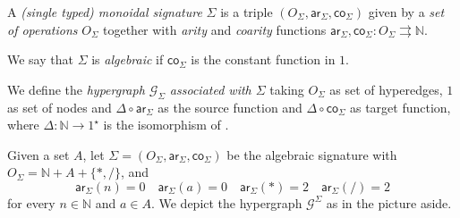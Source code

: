 \documentclass[3p]{elsarticle}
\newcommand{\ari}{\mathsf{ar}}
\newcommand{\coar}{\mathsf{co}}
\theoremstyle{remark}
\theoremstyle{definition}
\begin{document}
\smallskip 
\noindent
\begin{minipage}[l]{.75\linewidth}
	\begin{defi}\label{def:alg}
		A \emph{(single typed) monoidal signature} $\Sigma$ is a triple $(O_\Sigma, \ari_\Sigma, \coar_\Sigma)$ given by a \emph{set of operations} $O_\Sigma$ together with \emph{arity} and \emph{coarity} functions $\ari_\Sigma, \coar_\Sigma\colon O_\Sigma \rightrightarrows \mathbb{N}$.  
		
		We say that $\Sigma$ is \emph{algebraic} if $\coar_{\Sigma}$ is the constant function in $1$.
		
		We define the \emph{hypergraph $\mathcal{G}_\Sigma$ associated with $\Sigma$} taking $O_\Sigma$ as set of hyperedges, $1$ as set of nodes and $\Delta \circ \ari_\Sigma$ as the source function and $ \Delta \circ  \coar_{\Sigma}$ as target function, where $\Delta \colon \mathbb{N}\to 1^\star$ is the isomorphism of .
	\end{defi}
	
	\begin{exa}\label{exa_3} 
		Given a set $A$, let $\Sigma = (O_\Sigma, \ari_\Sigma, \coar_{\Sigma})$ be the algebraic signature with $O_\Sigma =  \mathbb{N} + A + \{*, /\}$, 
		and 
		\[\ari_\Sigma(n)=0 \quad \ari_\Sigma(a) = 0 \quad \ari_\Sigma(*) =2 \quad  \ari_\Sigma(/) = 2\]
		for every $n\in \mathbb{N}$ and $a\in A$. We depict the hypergraph $\mathcal{G}^\Sigma$  as in the picture aside.
	\end{exa}
	\end{minipage}
	\hfill
\end{document}
